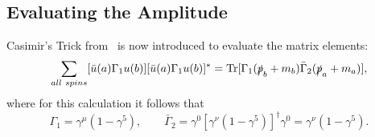 \subsection{Evaluating the Amplitude}
Casimir's Trick from~\cite{griffiths:2004:introduction} is now introduced to evaluate the matrix elements:
\begin{equation}\label{eq:casimir}
\sum_{all\ spins}[\bar{u}(a)\Gamma _1 u(b)][\bar{u}(a)\Gamma _1 u(b)]^*=\mathrm{Tr}[\Gamma _1 (\slashed{p}_b+m_b)\bar{\Gamma}_2(\slashed{p}_a+m_a)],
\end{equation} 
where for this calculation it follows that
\begin{equation}\label{eq:gammas}
\Gamma _1=\gamma ^{\mu}(1-\gamma ^5),\qquad
\bar{\Gamma} _2 = \gamma ^0[\gamma ^{\nu}(1-\gamma ^5)]^\dagger \gamma ^0= \gamma ^{\nu}(1-\gamma ^5). 
\end{equation}

